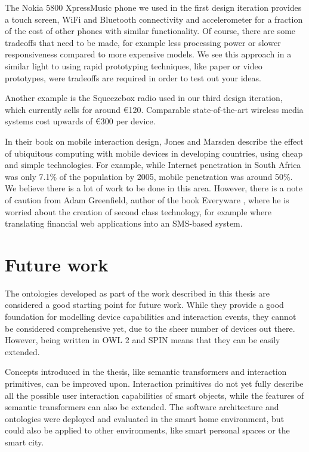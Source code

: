 The Nokia 5800 XpressMusic phone we used in the first design iteration provides a touch screen, WiFi and Bluetooth connectivity and accelerometer for a fraction of the cost of other phones with similar functionality. Of course, there are some tradeoffs that need to be made, for example less processing power or slower responsiveness compared to more expensive models. We see this approach in a similar light to using rapid prototyping techniques, like paper or video prototypes, were tradeoffs are required in order to test out your ideas.

Another example is the Squeezebox radio used in our third design iteration, which currently sells for around \euro 120. Comparable state-of-the-art wireless media systems cost upwards of \euro 300 per device.

In their book on mobile interaction design, Jones and Marsden \cite{Jones2006} describe the effect of ubiquitous computing with mobile devices in developing countries, using cheap and simple technologies.  For example, while Internet penetration in South Africa was only 7.1\% of the population by 2005, mobile penetration was around 50\%. We believe there is a lot of work to be done in this area. However, there is a note of caution from Adam Greenfield, author of the book Everyware \cite{Greenfield2006}, where he is worried about the creation of second class technology, for example where translating financial web applications into an SMS-based system.


\section{Future work}

The ontologies developed as part of the work described in this thesis are considered a good starting point for future work. While they provide a good foundation for modelling device capabilities and interaction events, they cannot be considered comprehensive yet, due to the sheer number of devices out there. However, being written in \ac{OWL} 2 and \ac{SPIN} means that they can be easily extended.

Concepts introduced in the thesis, like semantic transformers and interaction primitives, can be improved upon. Interaction primitives do not yet fully describe all the possible user interaction capabilities of smart objects, while the features of semantic transformers can also be extended. The software architecture and ontologies were deployed and evaluated in the smart home environment, but could also be applied to other environments, like smart personal spaces or the smart city.

